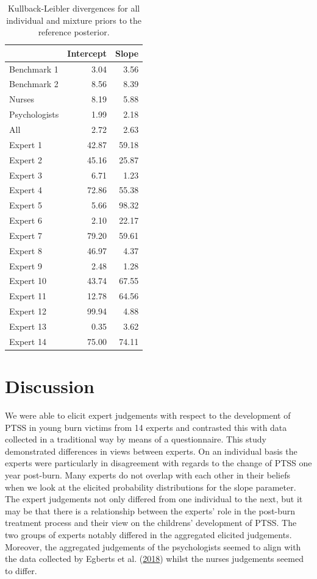 \documentclass[openright,titlepage,12pt,a4paper]{book}
\begin{document}
\begin{table}

\caption{\label{tab:ch06tab1}Kullback-Leibler divergences for all individual and mixture priors to the reference posterior.}
\centering
\begin{tabular}[t]{lrr}
\toprule
  & Intercept & Slope\\
\midrule
Benchmark 1 & 3.04 & 3.56\\
Benchmark 2 & 8.56 & 8.39\\
Nurses & 8.19 & 5.88\\
Psychologists & 1.99 & 2.18\\
All & 2.72 & 2.63\\
\addlinespace
Expert 1 & 42.87 & 59.18\\
Expert 2 & 45.16 & 25.87\\
Expert 3 & 6.71 & 1.23\\
Expert 4 & 72.86 & 55.38\\
Expert 5 & 5.66 & 98.32\\
\addlinespace
Expert 6 & 2.10 & 22.17\\
Expert 7 & 79.20 & 59.61\\
Expert 8 & 46.97 & 4.37\\
Expert 9 & 2.48 & 1.28\\
Expert 10 & 43.74 & 67.55\\
\addlinespace
Expert 11 & 12.78 & 64.56\\
Expert 12 & 99.94 & 4.88\\
Expert 13 & 0.35 & 3.62\\
Expert 14 & 75.00 & 74.11\\
\bottomrule
\end{tabular}
\end{table}

\hypertarget{discussion-1}{%
\section{Discussion}\label{discussion-1}}

We were able to elicit expert judgements with respect to the development of PTSS in young burn victims from 14 experts and contrasted this with data collected in a traditional way by means of a questionnaire. This study demonstrated differences in views between experts. On an individual basis the experts were particularly in disagreement with regards to the change of PTSS one year post-burn. Many experts do not overlap with each other in their beliefs when we look at the elicited probability distributions for the slope parameter. The expert judgements not only differed from one individual to the next, but it may be that there is a relationship between the experts' role in the post-burn treatment process and their view on the childrens' development of PTSS. The two groups of experts notably differed in the aggregated elicited judgements. Moreover, the aggregated judgements of the psychologists seemed to align with the data collected by Egberts et al. (\protect\hyperlink{ref-egberts_mother_2018}{2018}) whilst the nurses judgements seemed to differ.
\end{document}

